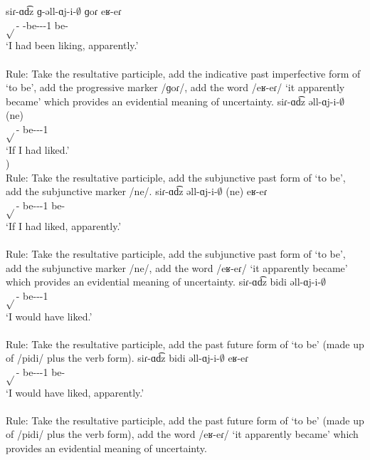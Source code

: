 \begin{exe}
\begin{xlist}
		\ex \gll siɾ-ɑd͡z ɡ-əll-ɑj-i-$\emptyset$ ɡoɾ eʁ-eɾ \\
		$\sqrt{}$-{\rptcp} {\ind}-be-{\thgloss}-{\pst}-1{\sg} {\prog} be-{\eptcp} \\
		\trans `I had been liking, apparently.' \\
		 \\ 
		Rule: Take the resultative participle, add the indicative past imperfective form of `to be', add the progressive marker /ɡoɾ/, add the word /eʁ-eɾ/ `it apparently became' which provides an evidential meaning of uncertainty.
		\ex \gll siɾ-ɑd͡z əll-ɑj-i-$\emptyset$ (ne) \\
		$\sqrt{}$-{\rptcp} be-{\thgloss}-{\pst}-1{\sg} {\sbjv} \\
		\trans `If I had liked.' \\
		) \\
		Rule: Take the resultative participle, add the subjunctive past form of `to be', add the subjunctive marker /ne/.
		\ex \gll siɾ-ɑd͡z əll-ɑj-i-$\emptyset$ (ne) eʁ-eɾ \\
		$\sqrt{}$-{\rptcp} be-{\thgloss}-{\pst}-1{\sg} {\sbjv} be-{\eptcp} \\
		\trans `If I had liked, apparently.' \\
		 \\
		Rule: Take the resultative participle, add the subjunctive past form of `to be', add the subjunctive marker /ne/, add the word /eʁ-eɾ/ `it apparently became' which provides an evidential meaning of uncertainty.
		\ex \gll siɾ-ɑd͡z bidi əll-ɑj-i-$\emptyset$ \\
		$\sqrt{}$-{\rptcp} {\fut} be-{\thgloss}-{\pst}-1{\sg} \\
		\trans `I would have liked.' \\
		 \\
		Rule: Take the resultative participle, add the past future form of `to be' (made up of /pidi/ plus the verb form). 
		\ex \gll siɾ-ɑd͡z bidi əll-ɑj-i-$\emptyset$ eʁ-eɾ \\
		$\sqrt{}$-{\rptcp} {\fut} be-{\thgloss}-{\pst}-1{\sg} be-{\eptcp} \\
		\trans `I would have liked, apparently.' \\
		 \\
		Rule: Take the resultative participle, add the past future form of `to be' (made up of /pidi/ plus the verb form), add the word /eʁ-eɾ/ `it apparently became' which provides an evidential meaning of uncertainty. 

\end{xlist}
\end{exe}
